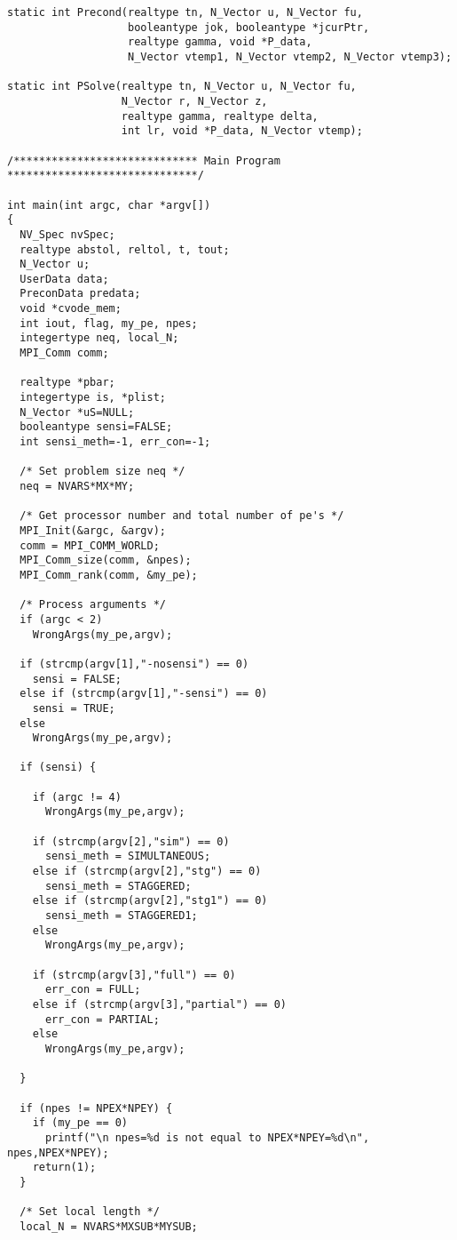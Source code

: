 \begin{verbatim}
static int Precond(realtype tn, N_Vector u, N_Vector fu,
                   booleantype jok, booleantype *jcurPtr, 
                   realtype gamma, void *P_data, 
                   N_Vector vtemp1, N_Vector vtemp2, N_Vector vtemp3);

static int PSolve(realtype tn, N_Vector u, N_Vector fu, 
                  N_Vector r, N_Vector z, 
                  realtype gamma, realtype delta,
                  int lr, void *P_data, N_Vector vtemp);

/***************************** Main Program ******************************/

int main(int argc, char *argv[])
{
  NV_Spec nvSpec;
  realtype abstol, reltol, t, tout;
  N_Vector u;
  UserData data;
  PreconData predata;
  void *cvode_mem;
  int iout, flag, my_pe, npes;
  integertype neq, local_N;
  MPI_Comm comm;

  realtype *pbar;
  integertype is, *plist;
  N_Vector *uS=NULL;
  booleantype sensi=FALSE;
  int sensi_meth=-1, err_con=-1;

  /* Set problem size neq */
  neq = NVARS*MX*MY;

  /* Get processor number and total number of pe's */
  MPI_Init(&argc, &argv);
  comm = MPI_COMM_WORLD;
  MPI_Comm_size(comm, &npes);
  MPI_Comm_rank(comm, &my_pe);

  /* Process arguments */
  if (argc < 2)
    WrongArgs(my_pe,argv);

  if (strcmp(argv[1],"-nosensi") == 0)
    sensi = FALSE;
  else if (strcmp(argv[1],"-sensi") == 0)
    sensi = TRUE;
  else
    WrongArgs(my_pe,argv);

  if (sensi) {

    if (argc != 4)
      WrongArgs(my_pe,argv);

    if (strcmp(argv[2],"sim") == 0)
      sensi_meth = SIMULTANEOUS;
    else if (strcmp(argv[2],"stg") == 0)
      sensi_meth = STAGGERED;
    else if (strcmp(argv[2],"stg1") == 0)
      sensi_meth = STAGGERED1;
    else 
      WrongArgs(my_pe,argv);

    if (strcmp(argv[3],"full") == 0)
      err_con = FULL;
    else if (strcmp(argv[3],"partial") == 0)
      err_con = PARTIAL;
    else
      WrongArgs(my_pe,argv);

  }

  if (npes != NPEX*NPEY) {
    if (my_pe == 0)
      printf("\n npes=%d is not equal to NPEX*NPEY=%d\n", npes,NPEX*NPEY);
    return(1);
  }

  /* Set local length */
  local_N = NVARS*MXSUB*MYSUB;


\end{verbatim}
